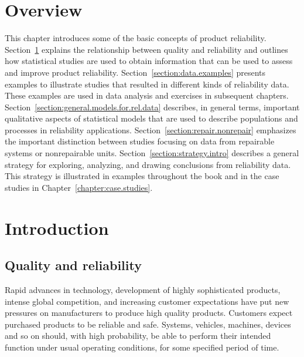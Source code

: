 \section*{Overview}
This chapter introduces some of the basic concepts of product
reliability. Section~\ref{section:intro} explains the relationship
between quality and reliability and outlines how statistical studies are
used to obtain information that can be used to assess and improve product
reliability.
Section~\ref{section:data.examples} presents examples to
illustrate studies that resulted in different kinds of reliability
data. These examples are used in data analysis and
exercises in subsequent chapters.
Section~\ref{section:general.models.for.rel.data} describes, in
general terms, important qualitative aspects of statistical models
that are used to describe populations and processes in reliability
applications.  Section~\ref{section:repair.nonrepair} emphasizes the
important distinction between studies focusing on data from repairable
systems or nonrepairable units. Section~\ref{section:strategy.intro}
describes a general strategy for exploring, analyzing, and drawing
conclusions from reliability data. This strategy is illustrated in
examples throughout the book and in the case studies in
Chapter~\ref{chapter:case.studies}.

\section{Introduction}
\label{section:intro}
\subsection{Quality and reliability}
\label{section:qual.rel}
Rapid advances in technology, development of highly sophisticated
products, intense global competition, and increasing customer
expectations have put new pressures on manufacturers to produce high
quality products.  Customers expect purchased products to be reliable
and safe.  Systems, vehicles, machines, devices and so on should, with
high probability, be able to perform their intended function under
usual operating conditions, for some specified period of time.

